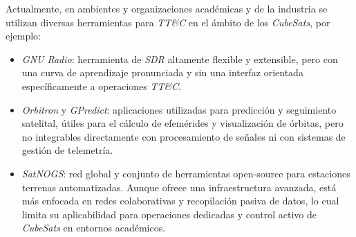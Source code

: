 Actualmente, en ambientes y organizaciones académicas y de la industria se utilizan diversas herramientas para \textit{TT\&C} en el ámbito de los \textit{CubeSats}, por ejemplo:

\begin{itemize}
    \item \textit{GNU Radio}: herramienta de \textit{SDR} altamente flexible y extensible, pero con una curva de aprendizaje pronunciada y sin una interfaz orientada específicamente a operaciones \textit{TT\&C}.
    
    \item \textit{Orbitron} y \textit{GPredict}: aplicaciones utilizadas para predicción y seguimiento satelital, útiles para el cálculo de efemérides y visualización de órbitas, pero no integrables directamente con procesamiento de señales ni con sistemas de gestión de telemetría.
    
    \item \textit{SatNOGS}: red global y conjunto de herramientas open-source para estaciones terrenas automatizadas. Aunque ofrece una infraestructura avanzada, está más enfocada en redes colaborativas y recopilación pasiva de datos, lo cual limita su aplicabilidad para operaciones dedicadas y control activo de \textit{CubeSats} en entornos académicos.
\end{itemize}
